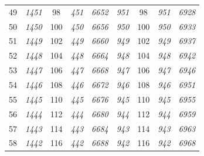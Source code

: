 \documentclass[10pt,fleqn]{article}
\begin{document}
\begin{longtable}{c|cccccccc}
49 & {\color{blue} \it 1451 \rm} & {\color{black} 98} & {\color{blue} \it 451 \rm} & {\color{blue} \it 6652 \rm} & {\color{blue} \it 951 \rm} & {\color{black} 98} & {\color{blue} \it 951 \rm} & {\color{blue} \it 6928 \rm} \\
50 & {\color{blue} \it 1450 \rm} & {\color{black} 100} & {\color{blue} \it 450 \rm} & {\color{blue} \it 6656 \rm} & {\color{blue} \it 950 \rm} & {\color{black} 100} & {\color{blue} \it 950 \rm} & {\color{blue} \it 6933 \rm} \\
51 & {\color{blue} \it 1449 \rm} & {\color{black} 102} & {\color{blue} \it 449 \rm} & {\color{blue} \it 6660 \rm} & {\color{blue} \it 949 \rm} & {\color{black} 102} & {\color{blue} \it 949 \rm} & {\color{blue} \it 6937 \rm} \\
52 & {\color{blue} \it 1448 \rm} & {\color{black} 104} & {\color{blue} \it 448 \rm} & {\color{blue} \it 6664 \rm} & {\color{blue} \it 948 \rm} & {\color{black} 104} & {\color{blue} \it 948 \rm} & {\color{blue} \it 6942 \rm} \\
53 & {\color{blue} \it 1447 \rm} & {\color{black} 106} & {\color{blue} \it 447 \rm} & {\color{blue} \it 6668 \rm} & {\color{blue} \it 947 \rm} & {\color{black} 106} & {\color{blue} \it 947 \rm} & {\color{blue} \it 6946 \rm} \\
54 & {\color{blue} \it 1446 \rm} & {\color{black} 108} & {\color{blue} \it 446 \rm} & {\color{blue} \it 6672 \rm} & {\color{blue} \it 946 \rm} & {\color{black} 108} & {\color{blue} \it 946 \rm} & {\color{blue} \it 6951 \rm} \\
55 & {\color{blue} \it 1445 \rm} & {\color{black} 110} & {\color{blue} \it 445 \rm} & {\color{blue} \it 6676 \rm} & {\color{blue} \it 945 \rm} & {\color{black} 110} & {\color{blue} \it 945 \rm} & {\color{blue} \it 6955 \rm} \\
56 & {\color{blue} \it 1444 \rm} & {\color{black} 112} & {\color{blue} \it 444 \rm} & {\color{blue} \it 6680 \rm} & {\color{blue} \it 944 \rm} & {\color{black} 112} & {\color{blue} \it 944 \rm} & {\color{blue} \it 6959 \rm} \\
57 & {\color{blue} \it 1443 \rm} & {\color{black} 114} & {\color{blue} \it 443 \rm} & {\color{blue} \it 6684 \rm} & {\color{blue} \it 943 \rm} & {\color{black} 114} & {\color{blue} \it 943 \rm} & {\color{blue} \it 6963 \rm} \\
58 & {\color{blue} \it 1442 \rm} & {\color{black} 116} & {\color{blue} \it 442 \rm} & {\color{blue} \it 6688 \rm} & {\color{blue} \it 942 \rm} & {\color{black} 116} & {\color{blue} \it 942 \rm} & {\color{blue} \it 6968 \rm} \\

\end{longtable}
\end{document}
